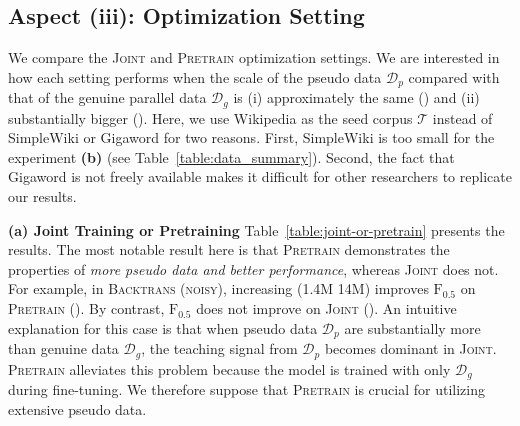 \documentclass[11pt,a4paper]{article}
\newcommand{\backtrans}{\textsc{Backtrans (noisy)}}
\newcommand{\joint}{\textsc{Joint}}
\newcommand{\pretrain}{\textsc{Pretrain}}
\newcommand{\pseudodata}{\ensuremath{\mathcal{D}_{p}}}
\newcommand{\genuinedata}{\ensuremath{\mathcal{D}_{g}}}
\newcommand{\seedcorpus}{\ensuremath{\mathcal{T}}}
\newcommand{\fscore}{\ensuremath{\mathrm{F}_{0.5}}}
\begin{document}
\subsection{Aspect (iii): Optimization Setting}
\label{subsec:optimization-strategy}
We compare the \joint{} and \pretrain{} optimization settings.
We are interested in how each setting performs when the scale of the pseudo data \pseudodata{} compared with that of the genuine parallel data \genuinedata{} is (i) approximately the same () and (ii) substantially bigger ().
Here, we use Wikipedia as the seed corpus \seedcorpus{} instead of SimpleWiki or Gigaword for two reasons. 
First, SimpleWiki is too small for the experiment \textbf{(b)} (see Table~\ref{table:data_summary}).
Second, the fact that Gigaword is not freely available makes it difficult for other researchers to replicate our results.


\noindent\textbf{(a) Joint Training or Pretraining}\hspace*{3mm}
Table~\ref{table:joint-or-pretrain} presents the results.
The most notable result here is that \pretrain{} demonstrates the properties of \textit{more pseudo data and better performance}, whereas \joint{} does not.
For example, in \backtrans{}, increasing  (1.4M  14M) improves \fscore{} on \pretrain{} ().
By contrast, \fscore{} does not improve on \joint{} ().
An intuitive explanation for this case is that when pseudo data \pseudodata{} are substantially more than genuine data \genuinedata{}, the teaching signal from \pseudodata{} becomes dominant in \joint{}.
\pretrain{} alleviates this problem because the model is trained with only \genuinedata{} during fine-tuning.
We therefore suppose that \pretrain{} is crucial for utilizing extensive pseudo data.
 
\end{document}
